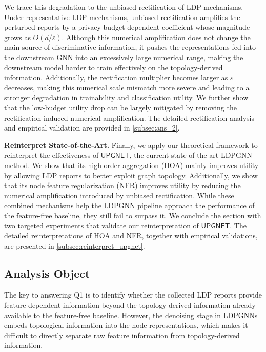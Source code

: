 \documentclass[conference,compsoc]{IEEEtran}
\theoremstyle{boldplain}
\theoremstyle{bolddefinition}
\theoremstyle{remark}
\newcommand{\mypara}[1]{\noindent\textbf{#1.}\xspace}
\newcommand{\hoa}{HOA\xspace}
\newcommand{\ldpgnn}{LDPGNN\xspace}
\newcommand{\ldpgnns}{LDPGNNs\xspace}
\newcommand{\upgnet}{\ensuremath{\mathsf{UPGNET}}\xspace}
\newcommand{\nfr}{NFR\xspace}
\begin{document}
 
We trace this degradation to the unbiased rectification of LDP mechanisms.
Under representative LDP mechanisms, unbiased rectification amplifies the perturbed reports by a privacy-budget-dependent coefficient whose magnitude grows as $O(d/\varepsilon)$. 
Although this numerical amplification does not change the main source of discriminative information, it pushes the representations fed into the downstream GNN into an excessively large numerical range, making the downstream model harder to train effectively on the topology-derived information. 
Additionally, the rectification multiplier becomes larger as $\varepsilon$ decreases, making this numerical scale mismatch more severe and leading to a stronger degradation in trainability and classification utility.
We further show that the low-budget utility drop can be largely mitigated by removing the rectification-induced numerical amplification. 
The detailed rectification analysis and empirical validation are provided in \autoref{subsec:ans_2}.


\vspace{0.1cm}


\mypara{Reinterpret State-of-the-Art} 
Finally, we apply our theoretical framework to reinterpret the effectiveness of \upgnet, the current state-of-the-art \ldpgnn method. 
We show that its high-order aggregation (\hoa) mainly improves utility by allowing LDP reports to better exploit graph topology. 
Additionally, we show that its node feature regularization (\nfr) improves utility by reducing the numerical amplification introduced by unbiased rectification. 
While these combined mechanisms help the \ldpgnn pipeline approach the performance of the feature-free baseline, they still fail to surpass it. 
We conclude the section with two targeted experiments that validate our reinterpretation of \upgnet.
The detailed reinterpretations of \hoa and \nfr, together with empirical validations, are presented in \autoref{subsec:reinterpret_upgnet}.



\subsection{Analysis Object}
\label{sec:analysis_object}



The key to answering Q1 is to identify whether the collected LDP reports provide feature-dependent information beyond the topology-derived information already available to the feature-free baseline.
However, the denoising stage in \ldpgnns embeds topological information into the node representations, which makes it difficult to directly separate raw feature information from topology-derived information.
\end{document}
